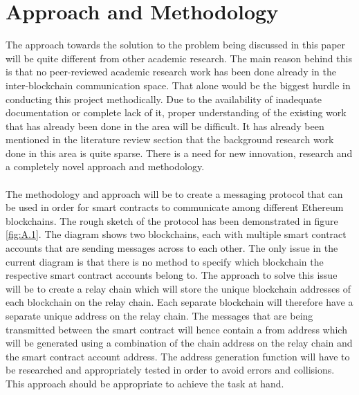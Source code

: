 \documentclass[a4paper,twoside,phd]{BYUPhys}
\begin{document}
\section{Approach and Methodology}
The approach towards the solution to the problem being discussed in this paper will be quite different from other academic research. The main reason behind this is that no peer-reviewed academic research work has been done already in the inter-blockchain communication space. That alone would be the biggest hurdle in conducting this project methodically. Due to the availability of inadequate documentation or complete lack of it, proper understanding of the existing work that has already been done in the area will be difficult. It has already been mentioned in the literature review section that the background research work done in this area is quite sparse. There is a need for new innovation, research and a completely novel approach and methodology.
\\
\\
The methodology and approach will be to create a messaging protocol that can be used in order for smart contracts to communicate among different Ethereum blockchains. The rough sketch of the protocol has been demonstrated in figure \ref{fig:A.1}. The diagram shows two blockchains, each with multiple smart contract accounts that are sending messages across to each other. The only issue in the current diagram is that there is no method to specify which blockchain the respective smart contract accounts belong to. The approach to solve this issue will be to create a relay chain which will store the unique blockchain addresses of each blockchain on the relay chain. Each separate blockchain will therefore have a separate unique address on the relay chain. The messages that are being transmitted between the smart contract will hence contain a from address which will be generated using a combination of the chain address on the relay chain and the smart contract account address. The address generation function will have to be researched and appropriately tested in order to avoid errors and collisions. This approach should be appropriate to achieve the task at hand.
\end{document}
